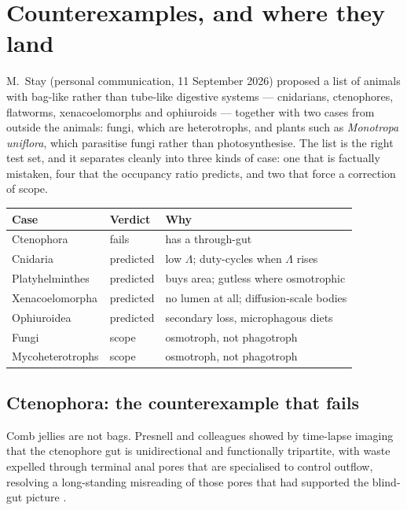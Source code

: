 \documentclass[11pt]{article}
\theoremstyle{plain}
\theoremstyle{definition}
\begin{document}
\section{Counterexamples, and where they land}
\label{sec:stay}

M.\ Stay (personal communication, 11 September 2026) proposed a list of animals with bag-like rather
than tube-like digestive systems --- cnidarians, ctenophores, flatworms, xenacoelomorphs and
ophiuroids --- together with two cases from outside the animals: fungi, which are heterotrophs, and
plants such as \emph{Monotropa uniflora}, which parasitise fungi rather than photosynthesise. The list
is the right test set, and it separates cleanly into three kinds of case: one that is factually
mistaken, four that the occupancy ratio predicts, and two that force a correction of scope.

\begin{center}
\begin{tabular}{@{}llp{5.2cm}@{}}
\toprule
Case & Verdict & Why \\
\midrule
Ctenophora & fails & has a through-gut \\
Cnidaria & predicted & low $\Lambda$; duty-cycles when $\Lambda$ rises \\
Platyhelminthes & predicted & buys area; gutless where osmotrophic \\
Xenacoelomorpha & predicted & no lumen at all; diffusion-scale bodies \\
Ophiuroidea & predicted & secondary loss, microphagous diets \\
Fungi & scope & osmotroph, not phagotroph \\
Mycoheterotrophs & scope & osmotroph, not phagotroph \\
\bottomrule
\end{tabular}
\end{center}

\subsection{Ctenophora: the counterexample that fails}

Comb jellies are not bags. Presnell and colleagues showed by time-lapse imaging that the ctenophore
gut is unidirectional and functionally tripartite, with waste expelled through terminal anal pores
that are specialised to control outflow, resolving a long-standing misreading of those pores that had
supported the blind-gut picture \cite{presnell2016,giribet2016}.
\end{document}
